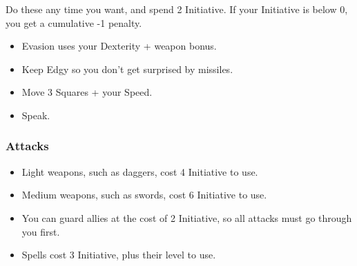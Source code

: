 \begin{multicols}{2}
Do these any time you want, and spend 2 Initiative.
If your Initiative is below 0, you get a cumulative -1 penalty.

\begin{itemize}

	\item{Evasion uses your Dexterity + weapon bonus.}
	\item{Keep Edgy so you don't get surprised by missiles.}
	\item{Move 3 Squares + your Speed.}
	\item{Speak.}

\end{itemize}

\subsubsection{Attacks}

\begin{itemize}

	\item{Light weapons, such as daggers, cost 4 Initiative to use.}
	\item{Medium weapons, such as swords, cost 6 Initiative to use.}
	\item{You can guard allies at the cost of 2 Initiative, so all attacks must go through you first.}
	\item{Spells cost 3 Initiative, plus their level to use.}

\end{itemize}

\end{multicols}
